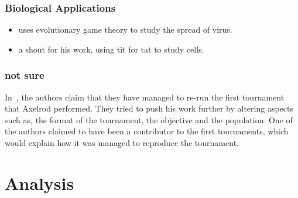 \documentclass{article}
\begin{document}
\subsubsection{Biological Applications}

\begin{itemize}
    \item \cite{Turner1999} uses evolutionary game theory to study the spread of
    virus.
    \item \cite{Douglas2011} a shout for his work, using tit for tat to study cells.
\end{itemize}
\subsubsection{not sure}
In~\cite{Rapoport2015}, the authors claim that they have managed to 
re-run the first tournament that Axelrod performed. They tried to push his work
further by altering aspects such as, the format of the tournament, the objective
and the population. One of the authors claimed to have been a contributor
to the first tournaments, which would explain how it was managed to reproduce
the tournament.

\section{Analysis}\label{section:analysis}



\end{document}
